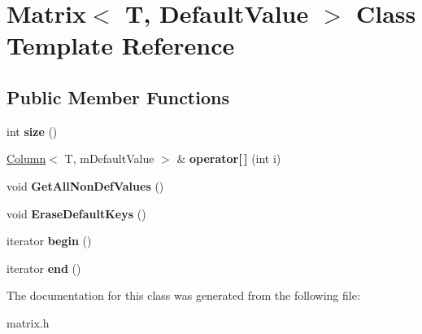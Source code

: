 \hypertarget{classMatrix}{}\section{Matrix$<$ T, Default\+Value $>$ Class Template Reference}
\label{classMatrix}
\subsection*{Public Member Functions}
\begin{DoxyCompactItemize}
\item 
\mbox{\label{classMatrix_aa40f0382d8561ca22eb36672cc42b466}} 
int {\bfseries size} ()
\item 
\mbox{\label{classMatrix_a9f8bef90bf8bba323b832cc58c50abff}} 
\hyperlink{classColumn}{Column}$<$ T, m\+Default\+Value $>$ \& {\bfseries operator\mbox{[}$\,$\mbox{]}} (int i)
\item 
\mbox{\label{classMatrix_ac51c4328b310232c27678a4ed2c44472}} 
void {\bfseries Get\+All\+Non\+Def\+Values} ()
\item 
\mbox{\label{classMatrix_af94fa0b8bc7d99ef0bb6d7622a8dade8}} 
void {\bfseries Erase\+Default\+Keys} ()
\item 
\mbox{\label{classMatrix_aabe0405fb9aee5221fe5c396ac88ab5e}} 
iterator {\bfseries begin} ()
\item 
\mbox{\label{classMatrix_a68feb1c4514ee677647fef2d405c44e8}} 
iterator {\bfseries end} ()
\end{DoxyCompactItemize}


The documentation for this class was generated from the following file\+:\begin{DoxyCompactItemize}
\item 
matrix.\+h\end{DoxyCompactItemize}
